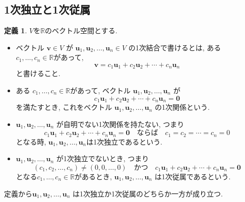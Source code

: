 \documentclass[dvipdfmx,a4paper,11pt]{article} %
\newcommand{\R}{\mathbb{R}}
\theoremstyle{definition}
\newtheorem{defn}[thm]{定義}
\begin{document}
\subsection{1次独立と1次従属 \cite[4.2節]{M}}

\begin{defn}
$V$を$\R$のベクトル空間とする.

\begin{itemize}
\item ベクトル $\bm{v} \in V$ が $\bm{u}_1,\bm{u}_2,\ldots,\bm{u}_n \in V$ の1次結合で書けるとは, ある
$c_1, \ldots, c_n \in\mathbb{R}$があって, 
\[
\bm{v}=c_1\bm{u}_1+c_2\bm{u}_2+\cdots+c_n\bm{u}_n
\]
と書けること. 
\item  ある
$c_1, \ldots, c_n \in\mathbb{R}$があって, ベクトル $\bm{u}_1,\bm{u}_2,\ldots,\bm{u}_n$ が
\[
c_1\bm{u}_1+c_2\bm{u}_2+\cdots+c_n\bm{u}_n=\bm{0}
\]
を満たすとき, これをベクトル $\bm{u}_1,\bm{u}_2,\ldots,\bm{u}_n$ の1次関係という.
\item  $\bm{u}_1,\bm{u}_2,\ldots,\bm{u}_n$ が自明でない1次関係を持たない, つまり
\[
c_1\bm{u}_1+c_2\bm{u}_2+\cdots+c_n\bm{u}_n=\bm{0}
\quad \text{ならば} \quad
c_1= c_2=\cdots=c_n=0
\]
となる時, $\bm{u}_1,\bm{u}_2,\ldots,\bm{u}_n$は1次独立であるという.
\item $\bm{u}_1,\bm{u}_2,\ldots,\bm{u}_n$ が1次独立でないとき, つまり
$$
(c_1, c_2, \ldots, c_n) \neq (0, 0, \ldots, 0)
\quad \text{かつ} \quad
c_1\bm{u}_1+c_2\bm{u}_2+\cdots+c_n\bm{u}_n=\bm{0}
$$
となる$c_1, \ldots, c_n \in\mathbb{R}$があるとき, $\bm{u}_1,\bm{u}_2,\ldots,\bm{u}_n$ は1次従属であるという.
\end{itemize}
\end{defn}
定義から$\bm{u}_1,\bm{u}_2,\ldots,\bm{u}_n$ は1次独立か1次従属のどちらか一方が成り立つ. 
\end{document}
